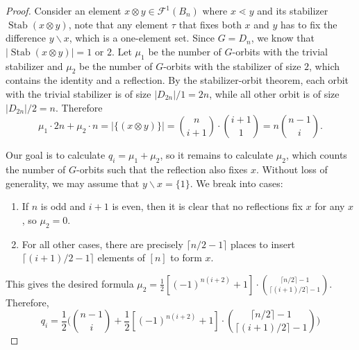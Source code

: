 \documentclass{amsart}
\theoremstyle{remark}
\newcommand{\minus}{\backslash}
\newcommand{\dstyle}{\displaystyle}
\def\Stab{\operatorname{Stab}}
\begin{document}
\begin{proof}
Consider an element $x \otimes y \in \mathcal F^1(B_n)$ where $x \lessdot y$ and its stabilizer $\Stab{(x \otimes y)}$, note that any element $\tau $ that fixes both $x$ and $y$ has to fix the difference $y\minus x$, which is a one-element set. Since $G = D_n$, %
we know that $|\Stab (x \otimes y)| = 1 $ or $2$.  %
Let $\mu_1$ be the number of $G$-orbits with the trivial stabilizer and $\mu_2$ be the number of $G$-orbits with the stabilizer of size $2$, which contains the identity and a reflection. By the stabilizer-orbit theorem, each orbit with the trivial stabilizer is of size $|D_{2n}| /1 = 2n $, while all other orbit is of size $|D_{2n}|/2 = n$.  Therefore $$\mu_1 \cdot 2n + \mu_2 \cdot n = |\{(x \otimes y)\}| = {n \choose {i+1}}  \cdot {{i+1} \choose 1} = n {n-1 \choose i }.$$

Our goal is to calculate $q_i = \mu_1 + \mu_2$,
so it remains to calculate $\mu_2$, which counts the number of $G$-orbits such that the reflection also fixes $x$. Without loss of generality, we may assume that $y\minus x = \{1\}$. %
We break into cases:
\begin{enumerate}
\item If $n$ is odd and $i+1$ is even, then it is clear that no reflections fix $x$ for any $x$, so $\mu_2=0$. 
\item For all other cases, there are precisely $\lceil n/2 -1\rceil$ places to insert $\lceil (i+1)/2 - 1 \rceil$ elements of $[n]$ to form $x$. %
\end{enumerate}
This gives the desired formula $\dstyle \mu_2 =  \frac{1}{2} [(-1)^{n(i+2)}+1] \cdot { \lceil n/2\rceil -1  \choose \lceil (i+1)/2 \rceil - 1}   $. Therefore, 
$$q_i = \frac{1}{2} \Big( {n-1 \choose i } + \frac{1}{2} [(-1)^{n(i+2)}+1] \cdot { \lceil n/2\rceil -1  \choose \lceil (i+1)/2 \rceil - 1}    \Big)$$
\end{proof}
\end{document}
